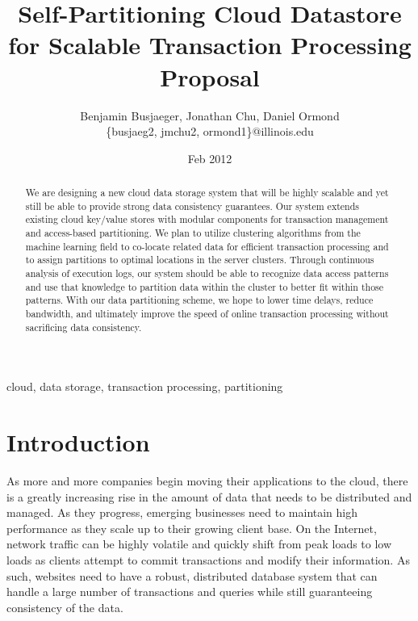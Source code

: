 \documentclass[10pt,final,journal]{IEEEtran}
\begin{document}
\title{Self-Partitioning Cloud Datastore for Scalable Transaction Processing Proposal}
\author{Benjamin Busjaeger, Jonathan Chu, Daniel Ormond \\
\{busjaeg2, jmchu2, ormond1\}@illinois.edu}
\date{Feb 2012}
\maketitle

\begin{abstract}
We are designing a new cloud data storage system that will be highly scalable and yet still be able to provide strong data consistency guarantees. Our system extends existing cloud key/value stores with modular components for transaction management and access-based partitioning. We plan to utilize clustering algorithms from the machine learning field to co-locate related data for efficient transaction processing and to assign partitions to optimal locations in the server clusters. Through continuous analysis of execution logs, our system should be able to recognize data access patterns and use that knowledge to partition data within the cluster to better fit within those patterns. With our data partitioning scheme, we hope to lower time delays, reduce bandwidth, and ultimately improve the speed of online transaction processing without sacrificing data consistency.
\end{abstract}

\begin{IEEEkeywords}
cloud, data storage, transaction processing, partitioning
\end{IEEEkeywords}

\section{Introduction}
As more and more companies begin moving their applications to the cloud, there is a greatly increasing rise in the amount of data that needs to be distributed and managed. As they progress, emerging businesses need to maintain high performance as they scale up to their growing client base. On the Internet, network traffic can be highly volatile and quickly shift from peak loads to low loads as clients attempt to commit transactions and modify their information. As such, websites need to have a robust, distributed database system that can handle a large number of transactions and queries while still guaranteeing consistency of the data. 
\end{document}
